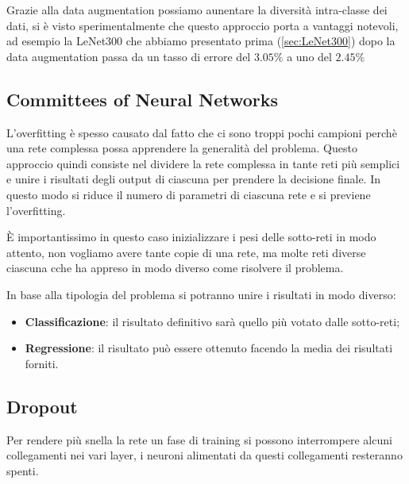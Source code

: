 Grazie alla data augmentation possiamo aunentare la diversità intra-classe dei dati, si è visto sperimentalmente che questo approccio porta a vantaggi notevoli, ad esempio la LeNet300 che abbiamo presentato prima (\ref{sec:LeNet300}) dopo la data augmentation passa da un tasso di errore del $3.05\%$ a uno del $2.45\%$

\subsection{Committees of Neural Networks}
L'overfitting è spesso causato dal fatto che ci sono troppi pochi campioni perchè una rete complessa possa apprendere la generalità del problema. Questo approccio quindi consiste nel dividere la rete complessa in tante reti più semplici e unire i risultati degli output di ciascuna per prendere la decisione finale. In questo modo si riduce il numero di parametri di ciascuna rete e si previene l'overfitting. 

È importantissimo in questo caso inizializzare i pesi delle sotto-reti in modo attento, non vogliamo avere tante copie di una rete, ma molte reti diverse ciascuna cche ha appreso in modo diverso come risolvere il problema.

In base alla tipologia del problema si potranno unire i risultati in modo diverso:
\begin{itemize}
	\item \textbf{Classificazione}: il risultato definitivo sarà quello più votato dalle sotto-reti;
	\item \textbf{Regressione}: il risultato può essere ottenuto facendo la media dei risultati forniti.
\end{itemize}

\subsection{Dropout}
Per rendere più snella la rete un fase di training si possono interrompere alcuni collegamenti nei vari layer, i neuroni alimentati da questi collegamenti resteranno spenti. 

